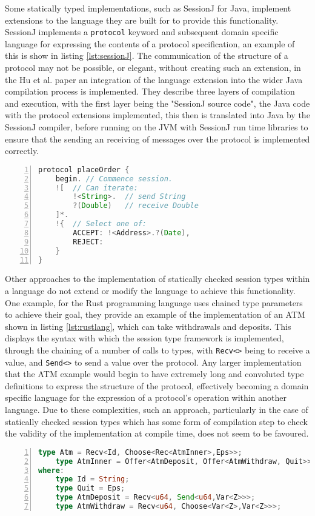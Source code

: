 \documentclass{article}
\begin{document}
	Some statically typed implementations, such as SessionJ\cite{hu2008session} for Java, implement extensions to the language they are built for to provide this functionality. SessionJ implements a \texttt{protocol} keyword and subsequent domain specific language for expressing the contents of a protocol specification, an example of this is show in listing \ref{lst:sessionJ}. The communication of the structure of a protocol may not be possible, or elegant, without creating such an extension, in the Hu et al. paper\cite{hu2008session} an integration of the language extension into the wider Java compilation process is implemented. They describe three layers of compilation and execution, with the first layer being the "SessionJ source code", the Java code with the protocol extensions implemented, this then is translated into Java by the SessionJ compiler, before running on the JVM with SessionJ run time libraries to ensure that the sending an receiving of messages over the protocol is implemented correctly.
	\begin{lstlisting}[language=java, frame=single, numbers=left, caption=An implementation of a protocol to place an order by Hu et al. to showcase the capabilities of SessionJ\cite{hu2008session}, label={lst:sessionJ}]
protocol placeOrder {
	begin. // Commence session.
	![ 	// Can iterate:
		!<String>. 	// send String
		?(Double) 	// receive Double
	]*.
	!{ 	// Select one of:
		ACCEPT: !<Address>.?(Date),
		REJECT:
	}
}

	\end{lstlisting}
	Other approaches to the implementation of statically checked session types within a language do not extend or modify the language to achieve this functionality. One example, for the Rust programming language\cite{jespersen2015session} uses chained type parameters to achieve their goal, they provide an example of the implementation of an ATM shown in listing \ref{lst:rustlang}, which can take withdrawals and deposits. This displays the syntax with which the session type framework is implemented, through the chaining of a number of calls to types, with \texttt{Recv<>} being to receive a value, and \texttt{Send<>} to send a value over the protocol. Any larger implementation that the ATM example would begin to have extremely long and convoluted type definitions to express the structure of the protocol, effectively becoming a domain specific language for the expression of a protocol's operation within another language. Due to these complexities, such an approach, particularly in the case of statically checked session types which has some form of compilation step to check the validity of the implementation at compile time, does not seem to be favoured.
\begin{lstlisting}[language=rust, frame=single, numbers=left, caption=An implementation of an ATM using session types in Rust\cite{jespersen2015session}, label={lst:rustlang}]
	type Atm = Recv<Id, Choose<Rec<AtmInner>,Eps>>;
	type AtmInner = Offer<AtmDeposit, Offer<AtmWithdraw, Quit>>>;
where:
	type Id = String;
	type Quit = Eps;
	type AtmDeposit = Recv<u64, Send<u64,Var<Z>>>;
	type AtmWithdraw = Recv<u64, Choose<Var<Z>,Var<Z>>>;
	\end{lstlisting}
\end{document}
